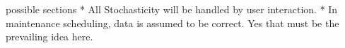 

possible sections
* All Stochasticity will be handled by user interaction. 
* In maintenance scheduling, data is assumed to be correct. Yes that must be the prevailing idea here.
